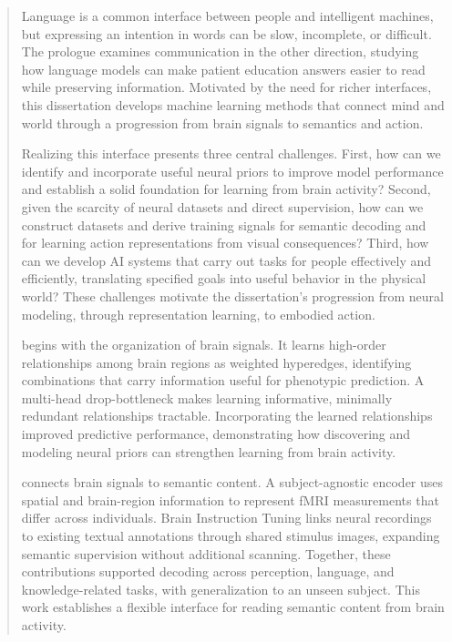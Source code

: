 \begin{abstract}

Language is a common interface between people and intelligent machines, but expressing an intention in words can be slow, incomplete, or difficult. The \repqa{} prologue examines communication in the other direction, studying how language models can make patient education answers easier to read while preserving information. Motivated by the need for richer interfaces, this dissertation develops machine learning methods that connect mind and world through a progression from brain signals to semantics and action.

Realizing this interface presents three central challenges. First, how can we identify and incorporate useful neural priors to improve model performance and establish a solid foundation for learning from brain activity? Second, given the scarcity of neural datasets and direct supervision, how can we construct datasets and derive training signals for semantic decoding and for learning action representations from visual consequences? Third, how can we develop AI systems that carry out tasks for people effectively and efficiently, translating specified goals into useful behavior in the physical world? These challenges motivate the dissertation's progression from neural modeling, through representation learning, to embodied action.

\hybrid{} begins with the organization of brain signals. It learns high-order relationships among brain regions as weighted hyperedges, identifying combinations that carry information useful for phenotypic prediction. A multi-head drop-bottleneck makes learning informative, minimally redundant relationships tractable. Incorporating the learned relationships improved predictive performance, demonstrating how discovering and modeling neural priors can strengthen learning from brain activity.

\pagebreak
\mindllm{} connects brain signals to semantic content. A subject-agnostic encoder uses spatial and brain-region information to represent fMRI measurements that differ across individuals. Brain Instruction Tuning links neural recordings to existing textual annotations through shared stimulus images, expanding semantic supervision without additional scanning. Together, these contributions supported decoding across perception, language, and knowledge-related tasks, with generalization to an unseen subject. This work establishes a flexible interface for reading semantic content from brain activity.


\end{abstract}
